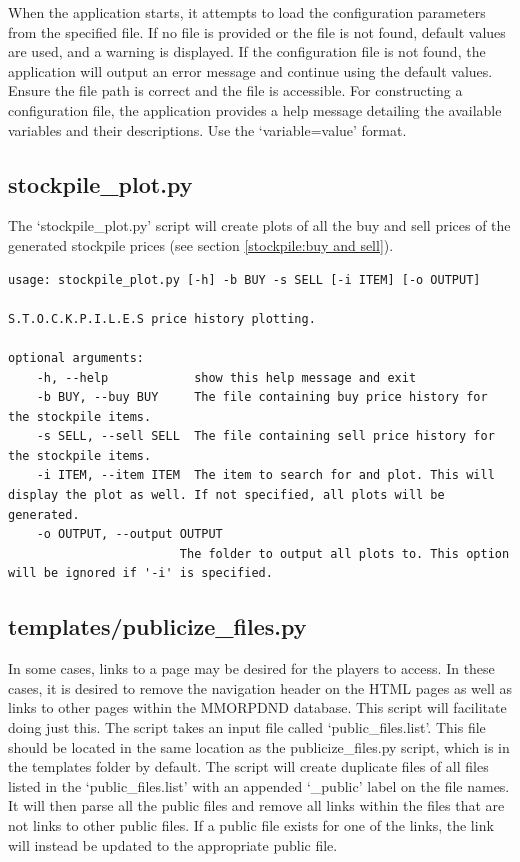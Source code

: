 When the application starts, it attempts to load the configuration parameters from the specified file. If no file is provided or the file is not found, default values are used, and a warning is displayed. If the configuration file is not found, the application will output an error message and continue using the default values. Ensure the file path is correct and the file is accessible. For constructing a configuration file, the application provides a help message detailing the available variables and their descriptions. Use the `variable=value' format.









\subsection{stockpile\_plot.py}

The `stockpile\_plot.py' script will create plots of all the buy and sell prices of the generated stockpile prices (see section \ref{stockpile:buy and sell}).

\begin{lstlisting}
usage: stockpile_plot.py [-h] -b BUY -s SELL [-i ITEM] [-o OUTPUT]

S.T.O.C.K.P.I.L.E.S price history plotting.

optional arguments:
	-h, --help            show this help message and exit
	-b BUY, --buy BUY     The file containing buy price history for the stockpile items.
	-s SELL, --sell SELL  The file containing sell price history for the stockpile items.
	-i ITEM, --item ITEM  The item to search for and plot. This will display the plot as well. If not specified, all plots will be generated.
	-o OUTPUT, --output OUTPUT
	                    The folder to output all plots to. This option will be ignored if '-i' is specified.
\end{lstlisting}




\subsection{templates/publicize\_files.py}

In some cases, links to a page may be desired for the players to access. In these cases, it is desired to remove the navigation header on the HTML pages as well as links to other pages within the MMORPDND database. This script will facilitate doing just this. The script takes an input file called `public\_files.list'. This file should be located in the same location as the publicize\_files.py script, which is in the templates folder by default. The script will create duplicate files of all files listed in the `public\_files.list' with an appended `\_public' label on the file names. It will then parse all the public files and remove all links within the files that are not links to other public files. If a public file exists for one of the links, the link will instead be updated to the appropriate public file.




